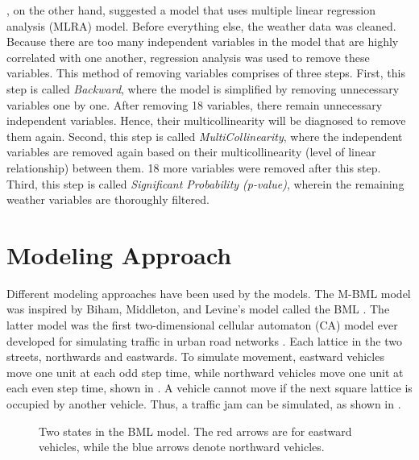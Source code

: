 , on the other hand, suggested a model that uses multiple linear regression analysis (MLRA) model. Before everything else, the weather data was cleaned. Because there are too many independent variables in the model that are highly correlated with one another, regression analysis was used to remove these variables. This method of removing variables comprises of three steps. First, this step is called \textit{Backward}, where the model is simplified by removing unnecessary variables one by one. After removing 18 variables, there remain unnecessary independent variables. Hence, their multicollinearity will be diagnosed to remove them again. Second, this step is called \textit{MultiCollinearity}, where the independent variables are removed again based on their multicollinearity (level of linear relationship) between them. 18 more variables were removed after this step. Third, this step is called \textit{Significant Probability (p-value)}, wherein the remaining weather variables are thoroughly filtered.





\section{Modeling Approach}
Different modeling approaches have been used by the models. The M-BML model was inspired by Biham, Middleton, and Levine’s model called the BML . The latter model was the first two-dimensional cellular automaton (CA) model ever developed for simulating traffic in urban road networks . Each lattice in the two streets, northwards and eastwards. To simulate movement, eastward vehicles move one unit at each odd step time, while northward vehicles move one unit at each even step time, shown in . A vehicle cannot move if the next square lattice is occupied by another vehicle. Thus, a traffic jam can be simulated, as shown in . 

\begin{figure}[!t]
  	\centering
    	\captionsetup{justification=centering}
  	\hfill
  	\caption{Two states in the BML model. The red arrows are for eastward vehicles, while the blue arrows denote northward vehicles.}
\end{figure}


